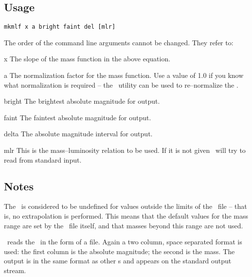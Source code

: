 \documentclass[11pt,twoside]{article}
\begin{document}
\subsection*{Usage}

\begin{verbatim}
mkmlf x a bright faint del [mlr]
\end{verbatim}

\nin
The order of the command line arguments cannot be changed. They refer to:
\medskip

\begin{clo}{x}
The slope of the mass function in the above equation.
\end{clo}

\begin{clo}{a}
The normalization factor for the mass function. Use a value of 1.0 if you 
know what normalization is required -- the \mknlf\ utility can be used to 
re--normalize the \lf.
\end{clo}

\begin{clo}{bright}
The brightest absolute magnitude for output.
\end{clo}

\begin{clo}{faint}
The faintest absolute magnitude for output.
\end{clo}

\begin{clo}{delta}
The absolute magnitude interval for output.
\end{clo}

\begin{clo}{mlr}
This is the mass--luminosity relation to be used. If it is not given \mkmlf\
will try to read from standard input.
\end{clo}

\subsection*{Notes}

The \mlr\ is considered to be undefined for values outside the limits of the
\mlr\ file -- that is, no extrapolation is performed. This means that the
default values for the mass range are set by the \mlr\ file itself, and that
masses beyond this range are not used.

\mkmlf\ reads the \mlr\ in the form of a file. Again a two column, space
separated format is used: the first column is the absolute magnitude; the
second is the mass. The output is in the same format as other \lf s and 
appears on the standard output stream.
\end{document}
